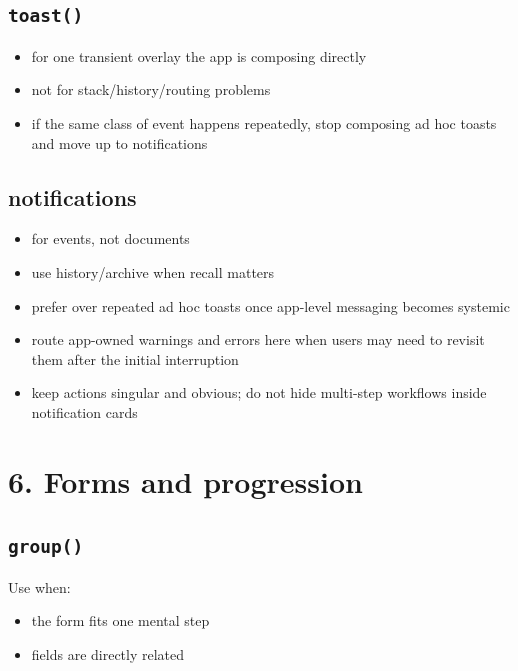 \subsection{\texorpdfstring{\texttt{t\allowbreak{}o\allowbreak{}a\allowbreak{}s\allowbreak{}t\allowbreak{}(\allowbreak{})}}{}}\label{record-023-toast-1}

\begin{itemize}
\tightlist
\item
  for one transient overlay the app is composing directly
\item
  not for stack/history/routing problems
\item
  if the same class of event happens repeatedly, stop composing ad hoc toasts and move up to notifications
\end{itemize}

\subsection{notifications}\label{record-023-notifications-1}

\begin{itemize}
\tightlist
\item
  for events, not documents
\item
  use history/archive when recall matters
\item
  prefer over repeated ad hoc toasts once app-level messaging becomes systemic
\item
  route app-owned warnings and errors here when users may need to revisit them after the initial interruption
\item
  keep actions singular and obvious; do not hide multi-step workflows inside notification cards
\end{itemize}

\section{6. Forms and progression}\label{record-023-forms-and-progression}

\subsection{\texorpdfstring{\texttt{g\allowbreak{}r\allowbreak{}o\allowbreak{}u\allowbreak{}p\allowbreak{}(\allowbreak{})}}{}}\label{record-023-group}

Use when:

\begin{itemize}
\tightlist
\item
  the form fits one mental step
\item
  fields are directly related
\end{itemize}

